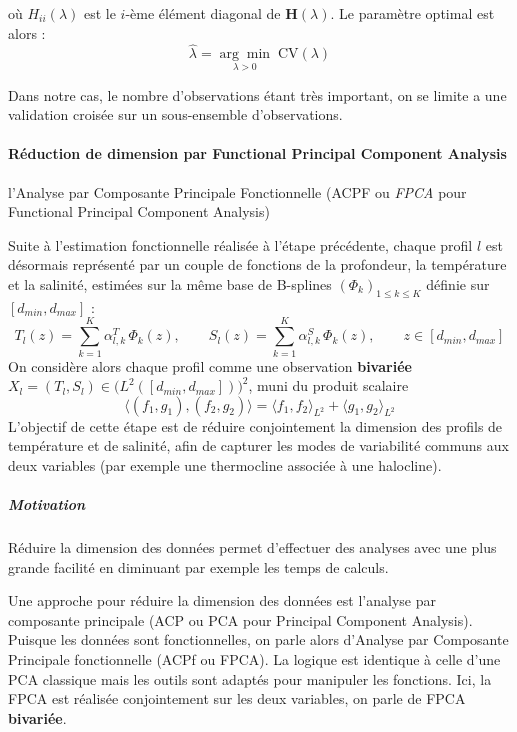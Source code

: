 \documentclass{article}
\begin{document}
	où $H_{ii}(\lambda)$ est le $i$-ème élément diagonal de $\mathbf{H}(\lambda)$. 
	Le paramètre optimal est alors :
	\begin{equation}
		\hat{\lambda} = \underset{\lambda > 0}{\arg\min}\; \text{CV}(\lambda)
	\end{equation}
	
	Dans notre cas, le nombre d'observations étant très important, on se limite a une validation croisée sur un sous-ensemble d'observations.
	
	
	\paragraph{Réduction de dimension par Functional Principal Component Analysis}
	
	l'Analyse par Composante Principale Fonctionnelle (ACPF ou \textit{FPCA} pour Functional Principal Component Analysis)
	
	Suite à l'estimation fonctionnelle réalisée à l'étape précédente, chaque profil $l$ est désormais représenté par un couple de fonctions de la profondeur, la température et la salinité, estimées sur la même base de B-splines $(\Phi_k)_{1\leq k \leq K}$ définie sur $[d_{min}, d_{max}]$ :
	\[
	T_l(z) = \sum_{k=1}^{K} \alpha_{l,k}^{T}\, \Phi_k(z), 
	\qquad
	S_l(z) = \sum_{k=1}^{K} \alpha_{l,k}^{S}\, \Phi_k(z),
	\qquad z \in [d_{min}, d_{max}]
	\]
	On considère alors chaque profil comme une observation \textbf{bivariée} $X_l = (T_l, S_l) \in \big(L^2([d_{min}, d_{max}])\big)^2$, muni du produit scalaire
	\[
	\langle (f_1, g_1), (f_2, g_2) \rangle = \langle f_1, f_2 \rangle_{L^2} + \langle g_1, g_2 \rangle_{L^2}
	\]
	L'objectif de cette étape est de réduire conjointement la dimension des profils de température et de salinité, afin de capturer les modes de variabilité communs aux deux variables (par exemple une thermocline associée à une halocline).
	
	\subparagraph{Motivation}
	Réduire la dimension des données permet d'effectuer des analyses avec une plus grande facilité en diminuant par exemple les temps de calculs.
	
	
	\vspace{2 em}
	
	Une approche pour réduire la dimension des données est l'analyse par composante principale (ACP ou PCA pour Principal Component Analysis). Puisque les données sont fonctionnelles, on parle alors d'Analyse par Composante Principale fonctionnelle (ACPf ou FPCA). La logique est identique à celle d'une PCA classique mais les outils sont adaptés pour manipuler les fonctions. Ici, la FPCA est réalisée conjointement sur les deux variables, on parle de FPCA \textbf{bivariée}.
	
\end{document}
